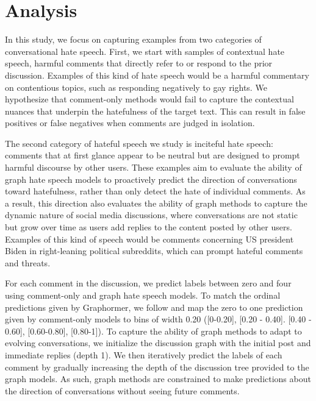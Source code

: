 \documentclass[letterpaper]{article} %
\begin{document}

\section{Analysis}
In this study, we focus on capturing examples from two categories of conversational hate speech. First, we start with samples of contextual hate speech, harmful comments that directly refer to or respond to the prior discussion. Examples of this kind of hate speech would be a harmful commentary on contentious topics, such as responding negatively to gay rights. We hypothesize that comment-only methods would fail to capture the contextual nuances that underpin the hatefulness of the target text. This can result in false positives or false negatives when comments are judged in isolation. 

The second category of hateful speech we study is inciteful hate speech: comments that at first glance appear to be neutral but are designed to prompt harmful discourse by other users. These examples aim to evaluate the ability of graph hate speech models to proactively predict the direction of conversations toward hatefulness, rather than only detect the hate of individual comments. As a result, this direction also evaluates the ability of graph methods to capture the dynamic nature of social media discussions, where conversations are not static but grow over time as users add replies to the content posted by other users. Examples of this kind of speech would be comments concerning US president Biden in right-leaning political subreddits, which can prompt hateful comments and threats.

For each comment in the discussion, we predict labels between zero and four using comment-only and graph hate speech models. To match the ordinal predictions given by Graphormer, we follow \citet{hebert2022predicting} and map the zero to one prediction given by comment-only models to bins of width 0.20 ([0-0.20], [0.20 - 0.40]. [0.40 - 0.60], [0.60-0.80], [0.80-1]). To capture the ability of graph methods to adapt to evolving conversations, we initialize the discussion graph with the initial post and immediate replies (depth 1). We then iteratively predict the labels of each comment by gradually increasing the depth of the discussion tree provided to the graph models. As such, graph methods are constrained to make predictions about the direction of conversations without seeing future comments. 
\end{document}
